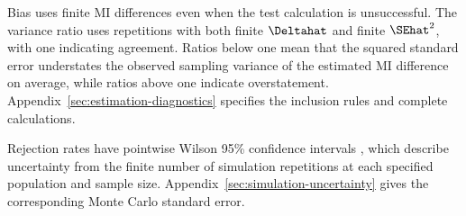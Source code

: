 Bias uses finite MI differences even when the test calculation is
unsuccessful. The variance ratio uses repetitions with both finite
\(\Deltahat\) and finite \(\SEhat^2\), with one indicating agreement. Ratios below
one mean that the squared standard error understates the observed sampling
variance of the estimated MI difference on average, while ratios above one
indicate overstatement.
Appendix~\ref{sec:estimation-diagnostics} specifies the inclusion rules
and complete calculations.

Rejection rates have pointwise Wilson 95\% confidence intervals
\citep{wilson1927}, which describe uncertainty from the finite number of
simulation repetitions at each specified population and sample size.
Appendix~\ref{sec:simulation-uncertainty} gives the corresponding Monte
Carlo standard error.

